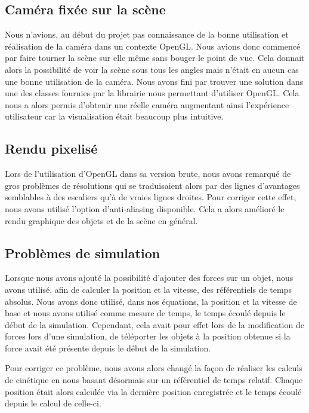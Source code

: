 \documentclass[11pt]{report}
\begin{document}
\subsection{Caméra fixée sur la scène}

Nous n'avions, au début du projet pas connaissance de la bonne utilisation et réalisation de la caméra dans un contexte OpenGL. Nous avions
donc commencé par faire tourner la scène sur elle même sans bouger le point de vue. Cela donnait alors la possibilité de voir la scène sous tous les angles mais n'était en aucun cas une bonne utilisation de la caméra. Nous avons fini par trouver une solution dans une des classes fournies par la librairie nous permettant d'utiliser OpenGL. Cela nous a alors permis d'obtenir une réelle caméra augmentant ainsi l'expérience utilisateur car la visualisation était beaucoup plus intuitive.

\newpage

\subsection{Rendu pixelisé}


Lors de l'utilisation d'OpenGL dans sa version brute, nous avons remarqué de gros problèmes de résolutions qui se traduisaient alors
par des lignes d'avantages semblables à des escaliers qu'à de vraies lignes droites. Pour corriger cette effet, nous avons utilisé l'option
d'anti-aliasing disponible. Cela a alors amélioré le rendu graphique des objets et de la scène en général.

\subsection{Problèmes de simulation}

Lorsque nous avons ajouté la possibilité d'ajouter des forces sur un objet, nous avons utilisé, afin de calculer la position et la vitesse, des
référentiels de temps absolus. Nous avons donc utilisé, dans nos équations, la position et la vitesse de base et nous avons utilisé comme mesure
de temps, le temps écoulé depuis le début de la simulation. Cependant, cela avait pour effet lors de la modification de forces lors d'une
simulation, de téléporter les objets à la position obtenue si la force avait été présente depuis le début de la simulation.

Pour corriger ce problème, nous avons alors changé la façon de réaliser les calculs de cinétique en nous basant désormais sur un référentiel de temps relatif. Chaque position était alors calculée via la dernière position enregistrée et le temps écoulé depuis le calcul de celle-ci.
\end{document}

